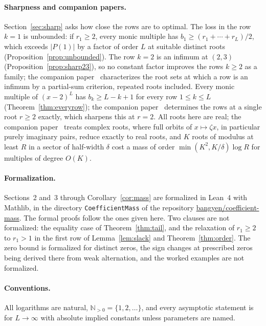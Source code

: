 \documentclass[11pt]{article}
\newcommand{\N}{\mathbb N}
\begin{document}
\paragraph{Sharpness and companion papers.}
Section~\ref{sec:sharp} asks how close the rows are to optimal.  The loss
in the row $k=1$ is unbounded: if $r_1\ge2$, every monic
multiple has $b_1\ge(r_1+\cdots+r_L)/2$, which exceeds $|P(1)|$ by a factor of order $L$
at suitable distinct roots (Proposition~\ref{prop:unbounded}).  The row
$k=2$ is an infimum at $(2,3)$ (Proposition~\ref{prop:sharp23}), so no constant
factor improves the rows $k\ge2$ as a family; the companion
paper~\cite{coefficient-mass-attainment} characterizes the root sets at which
a row is an infimum by a partial-sum criterion, repeated roots included.
Every monic multiple of $(x-2)^L$ has $b_k\ge L-k+1$ for every row
$1\le k\le L$ (Theorem~\ref{thm:everyrow}); the companion
paper~\cite{coefficient-mass-rows} determines the rows at a single root
$r\ge2$ exactly, which sharpens this at $r=2$.  All roots here are real; the
companion paper~\cite{coefficient-mass-complex} treats complex roots, where
full orbits of $x\mapsto\zeta x$, in particular purely imaginary pairs,
reduce exactly to real roots, and $K$ roots of modulus at least $R$ in a
sector of half-width $\delta$ cost a mass of order
$\min(K^2,K/\delta)\log R$ for multiples of degree $O(K)$.

\paragraph{Formalization.}
Sections~2 and~3 through Corollary~\ref{cor:mass} are formalized in Lean~4
with Mathlib, in the directory \texttt{CoefficientMass} of the repository
\href{https://github.com/bangyen/coefficient-mass}{bangyen/coefficient-mass}.
The formal proofs follow the ones given here.  Two clauses are not
formalized: the equality case of Theorem~\ref{thm:tail}, and the relaxation
of $r_1\ge2$ to $r_1>1$ in the first row of Lemma~\ref{lem:slack} and
Theorem~\ref{thm:order}.  The zero bound is formalized for distinct zeros,
the sign changes at prescribed zeros being derived there from weak
alternation, and the worked examples are not formalized.

\paragraph{Conventions.}
All logarithms are natural, $\N_{>0}=\{1,2,\ldots\}$, and every asymptotic
statement is for $L\to\infty$ with absolute implied constants unless
parameters are named.
\end{document}
